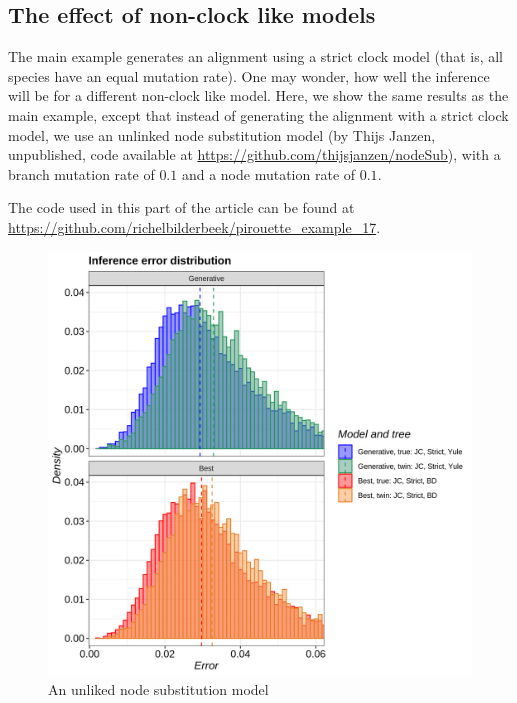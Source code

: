 \subsection{The effect of non-clock like models}
\label{subsec:non_clock}


The main example generates an alignment using a strict clock model (that is,
all species have an equal mutation rate).
One may wonder, how well the inference will be for a different non-clock like
model.
Here, we show the same results as the main example,
except that instead of generating the alignment with a strict clock
model, we use an unlinked node substitution model (by Thijs Janzen,
unpublished, code available at \url{https://github.com/thijsjanzen/nodeSub}),
with a branch mutation rate of $0.1$ and a node mutation rate of $0.1$.

The code used in this part of the article can be found at 
\url{https://github.com/richelbilderbeek/pirouette_example_17}.

\begin{figure}[H]
  \includegraphics[width=\textwidth]{pirouette_example_17/example_17/errors.png}
  \caption{An unliked node substitution model}
\end{figure}

